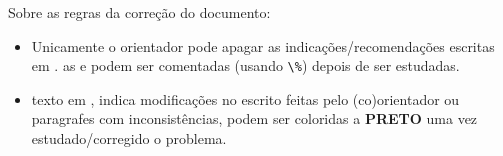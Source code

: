 Sobre as regras da correção do documento:
\begin{itemize}
\item 
{} Unicamente o orientador pode apagar as indicações/recomendações escritas em . as  e  podem ser comentadas (usando \verb|\%|) depois de ser estudadas.
\item 
{} texto em , indica modificações no escrito feitas pelo (co)orientador ou paragrafes com inconsistências, podem ser coloridas a \textbf{PRETO} uma vez estudado/corregido o problema.
\end{itemize}